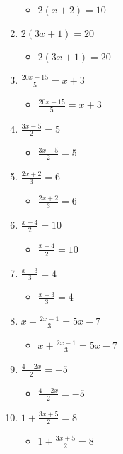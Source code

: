 \documentclass{article}
\begin{document}
\begin{enumerate}
\begin{itemize}
  \item $2(x+2)=10$
  \end{itemize}
\item $2(3x+1)=20$
  \begin{itemize}
  \item $2(3x+1)=20$
  \end{itemize}
\item {\Large $\frac{20x-15}{5}=x+3$}
  \begin{itemize}
  \item {\Large $\frac{20x-15}{5}=x+3$}
  \end{itemize}
\item {\Large $\frac{3x-5}{2}=5$}
  \begin{itemize}
  \item {\Large $\frac{3x-5}{2}=5$}
  \end{itemize}
\item {\Large $\frac{2x+2}{3}=6$}
  \begin{itemize}
  \item {\Large $\frac{2x+2}{3}=6$}
  \end{itemize}
\item {\Large $\frac{x+4}{2}=10$}
  \begin{itemize}
  \item {\Large $\frac{x+4}{2}=10$}
  \end{itemize}
\item {\Large $\frac{x-3}{3}=4$}
  \begin{itemize}
  \item {\Large $\frac{x-3}{3}=4$}
  \end{itemize}
\item {\Large $x+\frac{2x-1}{3}=5x-7$}
  \begin{itemize}
  \item {\Large $x+\frac{2x-1}{3}=5x-7$}
  \end{itemize}
\item {\Large $\frac{4-2x}{2}=-5$}
  \begin{itemize}
  \item {\Large $\frac{4-2x}{2}=-5$}
  \end{itemize}
\item {\Large $1+\frac{3x+5}{2}=8$}
  \begin{itemize}
  \item {\Large $1+\frac{3x+5}{2}=8$}
  \end{itemize}

\end{enumerate}
\end{document}

